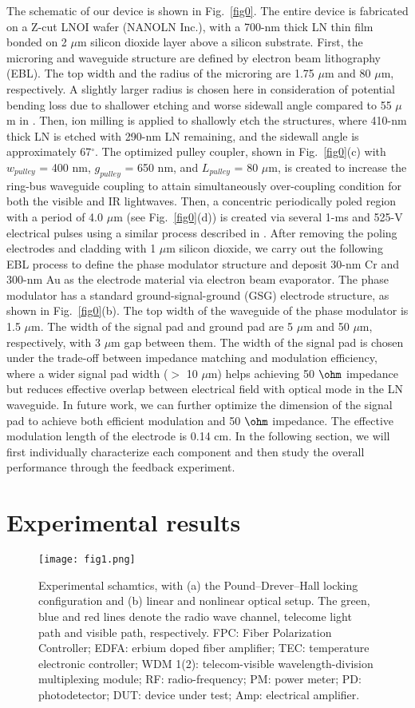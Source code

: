 \documentclass{WileyMSP-template}
\begin{document}
The schematic of our device is shown in Fig.~\ref{fig0}. The entire device is fabricated on a Z-cut LNOI wafer (NANOLN Inc.), with a 700-nm thick LN thin film bonded on 2 $\mu$m silicon dioxide layer above a silicon substrate. First, the microring and waveguide structure are defined by electron beam lithography (EBL). The top width and the radius of the microring are 1.75 $\mu$m and 80 $\mu$m, respectively. A slightly larger radius is chosen here in consideration of potential bending loss due to shallower etching and worse sidewall angle compared to 55 $\mu$m in \cite{ma2020ultrabright}. Then, ion milling is applied to shallowly etch the structures, where 410-nm thick LN is etched with 290-nm LN remaining, and the sidewall angle is approximately 67$^\circ$. The optimized pulley coupler, shown in Fig.~\ref{fig0}(c) with $w_{pulley}$ = 400 nm, $g_{pulley}$ = 650 nm, and $L_{pulley}$ = 80 $\mu$m, is created to increase the ring-bus waveguide coupling to attain simultaneously over-coupling condition for both the visible and IR lightwaves. Then, a concentric periodically poled region with a period of 4.0 $\mu$m (see Fig.~\ref{fig0}(d)) is created via several 1-ms and 525-V electrical pulses using a similar process described in \cite{chen2020efficient}. After removing the poling electrodes and cladding with 1 $\mu$m silicon dioxide, we carry out the following EBL process to define the phase modulator structure and deposit 30-nm Cr and 300-nm Au as the electrode material via electron beam evaporator. The phase modulator has a standard ground-signal-ground (GSG) electrode structure, as shown in Fig.~\ref{fig0}(b). The top width of the waveguide of the phase modulator is 1.5 $\mu$m. The width of the signal pad and ground pad are 5 $\mu$m and 50 $\mu$m, respectively, with 3 $\mu$m gap between them. The width of the signal pad is chosen under the trade-off between impedance matching and modulation efficiency, where a wider signal pad width ($>$ 10 $\mu$m) helps achieving 50 $\ohm$ impedance but reduces effective overlap between electrical field with optical mode in the LN waveguide. In future work, we can further optimize the dimension of the signal pad to achieve both efficient modulation and 50 $\ohm$ impedance. The effective modulation length of the electrode is 0.14 cm. In the following section, we will first individually characterize each component and then study the overall performance through the feedback experiment. 

\section{Experimental results}
\begin{figure}
  \texttt{[image: fig1.png]}
  \caption{Experimental schamtics, with (a) the Pound–Drever–Hall locking configuration and (b) linear and nonlinear optical setup. The green, blue and red lines denote the radio wave channel, telecome light path and visible path, respectively. FPC: Fiber Polarization Controller; EDFA: erbium doped fiber amplifier; TEC: temperature electronic controller;  WDM 1(2): telecom-visible wavelength-division multiplexing module; RF: radio-frequency; PM: power meter; PD: photodetector; DUT: device under test; Amp: electrical amplifier.}
  \label{fig1}
\end{figure}
\end{document}
